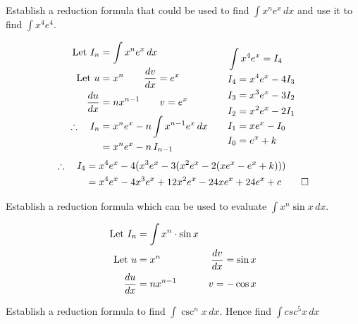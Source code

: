 \documentclass{standalone}
\begin{document}
	
	\begin{example}
		Establish a reduction formula that could be used to find $\int x^ne^x \, dx$ and use it to find $\int x^4e^4$.
	\end{example}
	
	\begin{equation*}
		\begin{split}
			\text{Let } I_n &= \int x^ne^x \, dx \\
			\text{Let } u 	&= x^n    \qquad   \frac{dv}{dx} = e^x \\
			\frac{du}{dx}     	&= nx^{n-1} \qquad  v = e^x         \\
			\therefore \quad I_n	&= x^ne^x - n \int x^{n-1}e^x \, dx\qquad\\
			&= x^ne^x - n\, I_{n-1}
		\end{split}
		\begin{split}
			&\int x^4e^x = I_4\\
			&I_4 = x^4e^x - 4I_3\\
			&I_3 = x^3e^x - 3I_2\\
			&I_2 = x^2e^x - 2I_1\\		
			&I_1 = xe^x - I_0\\				 		 	
			&I_0 = e^x + k
		\end{split}
	\end{equation*}
	\begin{align*}
		\therefore \quad I_4 & = x^4e^x -4(x^3e^x - 3(x^2e^x - 2(xe^x - e^x + k))) \\
		& = x^4e^x -4x^3e^x + 12x^2e^x - 24xe^x + 24e^x + c   \qed
	\end{align*}
	
	\begin{example}
		Establish a reduction formula which can be used to evaluate $\int x^n \sin x \, dx$.
	\end{example}
	
	\begin{align*}
		\text{Let } I_n &= \int x^n \cdot \sin x\\
		\text{Let } u & = x^n      & \frac{dv}{dx} = \sin x \\
		\frac{du}{dx}     & = nx^{n-1} & v= -\cos x         
	\end{align*}
	\hrulefill
	\begin{example}
		Establish a reduction formula to find $\int \csc^nx \, dx$. Hence find $\int csc^5x \, dx$
	\end{example}
\end{document}
